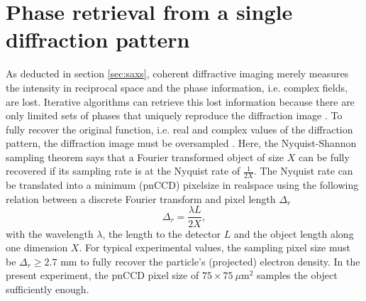 \section{Phase retrieval from a single diffraction pattern}\label{sec:phase-retrieval}
As deducted in section \ref{sec:saxs}, coherent diffractive imaging merely measures the intensity in reciprocal space and the phase information, i.e. complex fields, are lost. Iterative algorithms can retrieve this lost information because there are only limited sets of phases that uniquely reproduce the diffraction image \citep{Bruck-1979-OpticsCom,Bates-1981-Optik}. To fully recover the original function, i.e. real and complex values of the diffraction pattern, the diffraction image must be oversampled \citep{Sayre-1952-ActCryst}. Here, the Nyquist-Shannon sampling theorem says that a Fourier transformed object of size $X$ can be fully recovered if its sampling rate is at the Nyquist rate of $\frac{1}{2X}$\index{}. The Nyquist rate can be translated into a minimum (pnCCD) pixelsize in realspace using the following relation between a discrete Fourier transform and pixel length $\Delta_{r}$ \citep{Williams-2010-NJP}
\begin{equation}
\Delta_{r} = \frac{\lambda L}{2 X},
\label{eq:disc-fourier-relation-pixelsize}
\end{equation}
with the wavelength $\lambda$, the length to the detector $L$ and the object length along one dimension $X$. For typical experimental values, the sampling pixel size must be $\Delta_{r} \geq 2.7$ mm to fully recover the particle's (projected) electron density. In the present experiment, the pnCCD pixel size of $75 \times 75~\mu\text{m}^{2}$ samples the object sufficiently enough.
%
%
%
